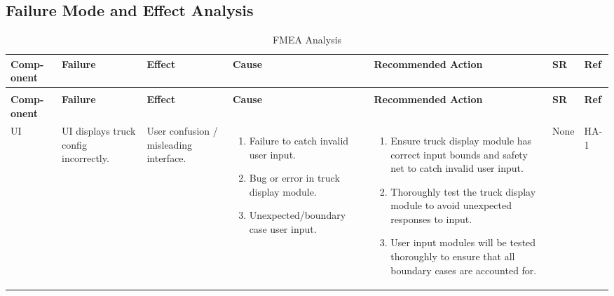 \documentclass{article}
\begin{document}
\begin{landscape}

\section{Failure Mode and Effect Analysis}

\begin{longtable}{|p{} | p{} | p{} | p{} | p{} | p{} | p{}|}
  \caption{FMEA Analysis}
  \label{TblFMEA}\\
  \hline
  \textbf{Comp- onent} & \textbf{Failure} & \textbf{Effect} & \textbf{Cause} & \textbf{Recommended Action} & \textbf{SR} & \textbf{Ref}\\
  \hline
  \endfirsthead
  \caption[]{FMEA Analysis}\\
  \hline
  \textbf{Comp- onent} & \textbf{Failure} & \textbf{Effect} & \textbf{Cause} & \textbf{Recommended Action} & \textbf{SR} & \textbf{Ref}\\
  \hline
  \endhead
  UI & UI displays truck config incorrectly. & User confusion / misleading interface. &
  \begin{enumerate}[leftmargin=*, label={\alph*.}, itemsep=1pt, topsep=0pt, partopsep=0pt] 
    \item Failure to catch invalid user input.
    \item Bug or error in truck display module.
    \item Unexpected/boundary case user input.
  \end{enumerate} &
  \begin{enumerate}[leftmargin=*, label={\alph*.}, itemsep=1pt, topsep=0pt, partopsep=0pt] 
    \item Ensure truck display module has correct input bounds and safety net to catch invalid user input.
    \item Thoroughly test the truck display module to avoid unexpected responses to input.
    \item User input modules will be tested thoroughly to ensure that all boundary cases are accounted for.
  \end{enumerate} & 
  None & HA-1 \\

  \hline


\end{longtable}
\end{landscape}
\end{document}
